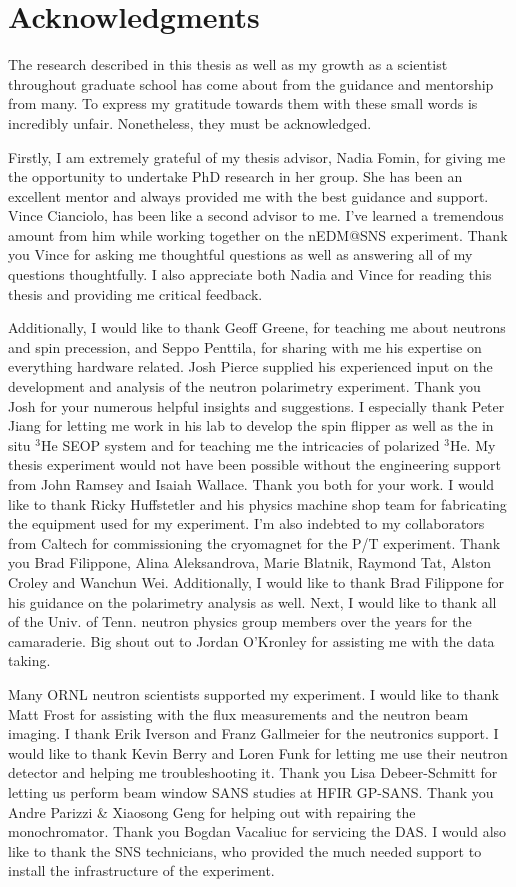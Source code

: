 \chapter*{Acknowledgments}

The research described in this thesis as well as my growth as a scientist throughout graduate school has come about from the guidance and mentorship from many. To express my gratitude towards them with these small words is incredibly unfair. Nonetheless, they must be acknowledged.

Firstly, I am extremely grateful of my thesis advisor, Nadia Fomin, for giving me the opportunity to undertake PhD research in her group. She has been an excellent mentor and always provided me with the best guidance and support. Vince Cianciolo, has been like a second advisor to me. I've learned a tremendous amount from him while working together on the nEDM@SNS experiment. Thank you Vince for asking me thoughtful questions as well as answering all of my questions thoughtfully. I also appreciate both Nadia and Vince for reading this thesis and providing me critical feedback.

Additionally, I would like to thank Geoff Greene, for teaching me about neutrons and spin precession, and Seppo Penttila, for sharing with me his expertise on everything hardware related. Josh Pierce supplied his experienced input on the development and analysis of the neutron polarimetry experiment. Thank you Josh for your numerous helpful insights and suggestions. I especially thank Peter Jiang for letting me work in his lab to develop the spin flipper as well as the in situ $^3$He SEOP system and for teaching me the intricacies of polarized $^3$He. My thesis experiment would not have been possible without the engineering support from John Ramsey and Isaiah Wallace. Thank you both for your work. I would like to thank Ricky Huffstetler and his physics machine shop team for fabricating the equipment used for my experiment. I'm also indebted to my collaborators from Caltech for commissioning the cryomagnet for the P/T experiment. Thank you Brad Filippone, Alina Aleksandrova, Marie Blatnik, Raymond Tat, Alston Croley and Wanchun Wei. Additionally, I would like to thank Brad Filippone for his guidance on the polarimetry analysis as well. Next, I would like to thank all of the Univ. of Tenn. neutron physics group members over the years for the camaraderie. Big shout out to Jordan O'Kronley for assisting me with the data taking.

Many ORNL neutron scientists supported my experiment. I would like to thank Matt Frost for assisting with the flux measurements and the neutron beam imaging. I thank Erik Iverson and Franz Gallmeier for the neutronics support. I would like to thank Kevin Berry and Loren Funk for letting me use their neutron detector and helping me troubleshooting it. Thank you Lisa Debeer-Schmitt for letting us perform beam window SANS studies at HFIR GP-SANS. Thank you Andre Parizzi \& Xiaosong Geng for helping out with repairing the monochromator. Thank you Bogdan Vacaliuc for servicing the DAS. I would also like to thank the SNS technicians, who provided the much needed support to install the infrastructure of the experiment.

